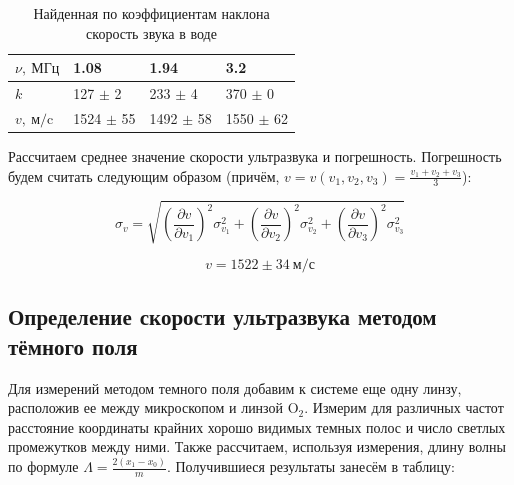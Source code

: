 \documentclass[14pt,a4paper]{article}
\begin{document}
\begin{table}[!ht]
    \centering
    \begin{tabular}{|l|l|l|l|}
    \hline
        $\nu, \ \text{МГц}$ & 1.08 & 1.94 & 3.2 \\ \hline
        $k$ & 127 $\pm$ 2& 233 $\pm$ 4& 370 $\pm$ 0  \\ \hline
        $v, \ \text{м/c}$& 1524 $\pm$ 55 & 1492 $\pm$ 58 & 1550  $\pm$ 62\\ \hline
    \end{tabular}
\caption{Найденная по коэффициентам наклона скорость звука в воде}
\end{table}

\newpage
Рассчитаем среднее значение скорости ультразвука и погрешность. Погрешность будем считать следующим образом (причём, $v = v(v_1, v_2, v_3) = \frac{v_1+v_2+v_3}{3}$):

\[
\sigma_v = \sqrt{\left(\frac{\partial v}{\partial v_1}\right)^2\sigma_{v_1}^2 + \left(\frac{\partial v}{\partial v_2}\right)^2\sigma_{v_2}^2 + \left(\frac{\partial v}{\partial v_3}\right)^2\sigma_{v_3}^2}
\]

\[
\boxed{ v = 1522 \pm 34  \ \text{м/с}}
\]


\subsection*{Определение скорости ультразвука методом тёмного поля}
Для измерений методом темного поля добавим к системе еще одну линзу, расположив ее между микроскопом и линзой O$_2$. Измерим для различных частот расстояние координаты крайних хорошо видимых темных полос и число светлых промежутков между ними. Также рассчитаем, используя измерения, длину волны по формуле $\Lambda = \frac{2(x_1 - x_0)}{m}$. Получившиеся результаты занесём в таблицу:

\begin{table}[H]
    \centering
\end{table}
\end{document}
